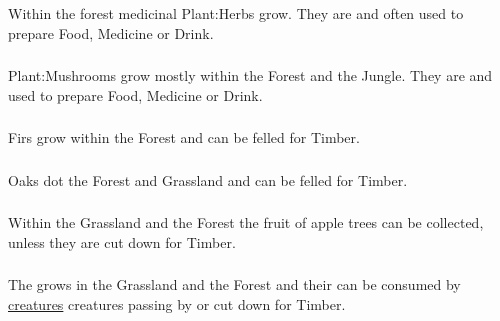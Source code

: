 \subsubsection{}

Within the forest medicinal \glspl*{Plant:Herb} grow. They are
 and often used to prepare \gls{Food}, \gls{Medicine}
or \gls{Drink}.

\subsubsection{}

\Glspl*{Plant:Mushroom} grow mostly within the \gls{Forest} and the \gls{Jungle}.
They are  and used
to prepare \gls{Food}, \gls{Medicine} or \gls{Drink}.

\subsubsection{}

\Glspl*{Fir} grow within the \gls{Forest} and can be felled for \gls{Timber}.

\subsubsection{}

\Glspl*{Oak} dot the \gls{Forest} and \gls{Grassland} and can be felled for \gls{Timber}.

\subsubsection{}

Within the \gls{Grassland} and the \gls{Forest} the  {fruit} of
apple trees can be collected, unless they are cut down for \gls{Timber}.

\subsubsection{}

The  grows in the \gls{Grassland} and the \gls{Forest}
and their  can be consumed by
\hyperref[ch:World:Inhabitants]{creatures} creatures passing by or cut down for
\gls{Timber}.